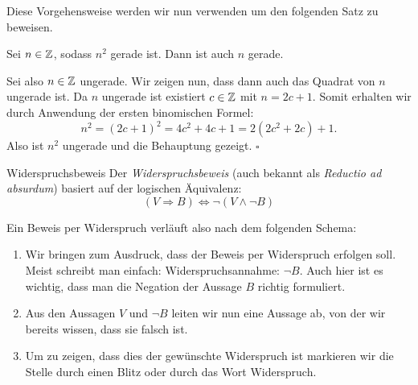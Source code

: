 \begin{frame}
Diese Vorgehensweise werden wir nun verwenden um den folgenden Satz zu beweisen.

\begin{theorem}
Sei $n \in \mathbb{Z}$, sodass $n^2$ gerade ist.
Dann ist auch $n$ gerade.
\end{theorem}

\begin{proof*}
Sei also $n \in \mathbb{Z}$ ungerade.
Wir zeigen nun, dass dann auch das Quadrat
von $n$ ungerade ist.
Da $n$ ungerade ist existiert $c \in \mathbb{Z}$ mit $n = 2c + 1$.
Somit erhalten wir durch Anwendung der ersten binomischen Formel:
\[
    n^2 = (2c +1)^2 = 4c^2 + 4c + 1 = 2(2c^2 + 2c) + 1 .
\]
Also ist $n^2$ ungerade und die Behauptung gezeigt.
\hfill $\square$
\end{proof*}
\end{frame}


\begin{frame}{Widerspruchsbeweis}
Der \textit{Widerspruchsbeweis} (auch bekannt als \textit{Reductio ad absurdum})
basiert auf der logischen Äquivalenz:
\[
(V \Rightarrow B) \iff \neg (V \wedge \neg B)
\]

Ein Beweis per Widerspruch verläuft also nach dem folgenden Schema:

\begin{enumerate}
\item Wir bringen zum Ausdruck, dass der Beweis per Widerspruch erfolgen soll.
Meist schreibt man einfach: \glqq Widerspruchsannahme: $\neg B$\grqq.
Auch hier ist es wichtig, dass man die Negation der Aussage $B$ richtig
formuliert.

\item Aus den Aussagen $V$ und $\neg B$ leiten wir nun eine Aussage ab, von der
wir bereits wissen, dass sie falsch ist.

\item Um zu zeigen, dass dies der gewünschte Widerspruch ist markieren wir die
Stelle durch einen Blitz oder durch das Wort \glqq Widerspruch\grqq.
\end{enumerate}
\end{frame}


